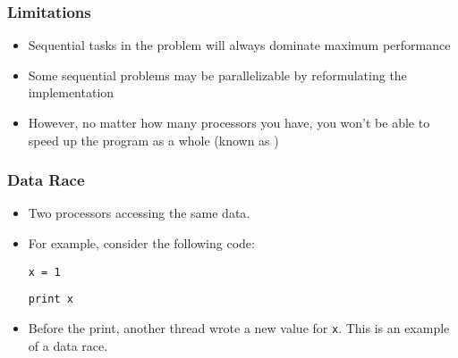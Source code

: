 \begin{frame}
  \frametitle{Limitations}

\hspace*{.1\textwidth}\begin{minipage}{.85\textwidth}
  \begin{itemize}
    \item Sequential tasks in the problem will always dominate maximum
          performance\\[1em]
    \item Some sequential problems may be parallelizable by reformulating the
          implementation\\[1em]
    \item However, no matter how many processors you have, you won't be able to
          speed up the program as a whole (known as )
  \end{itemize}
\end{minipage}

\end{frame}

\begin{frame}[containsverbatim]
  \frametitle{Data Race}

  \begin{itemize}
    \item Two processors accessing the same data.
    \vfill
    \item For example, consider the following code:

          \verb+x = 1+

          \verb+print x+

    \vfill
    \item {} Before the print, another thread wrote a new value
          for \verb+x+. This is an example of a data race.
  \end{itemize}
\end{frame}

